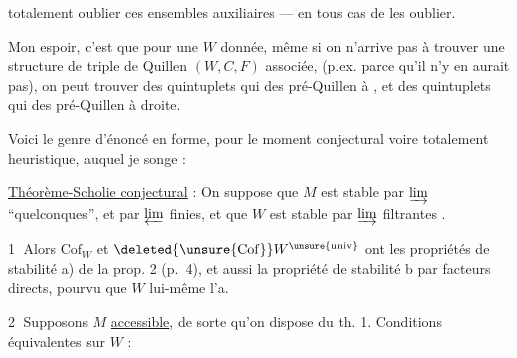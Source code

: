 
totalement oublier ces ensembles auxiliaires
---  en tous cas de les oublier.

Mon espoir, c'est que pour une $W$ donnée,
même si on n'arrive pas à trouver
une structure de triple de Quillen
$(W,C,F)$ associée, (p.ex. parce qu'il n'y en
aurait pas), on peut trouver  des
quintuplets  qui  des pré-Quillen à ,
et des quintuplets  qui  des pré-Quillen
à droite.

Voici le genre d'énoncé en forme,
pour le moment conjectural voire totalement
heuristique, auquel je songe :

\uline{Théorème-Scholie conjectural} : On suppose
que $M$ est stable par $\varinjlim$ ``quelconques'',
et par $\varprojlim$ finies, et que $W$ est
stable par $\varinjlim$ filtrantes  .

\textcircled{1} Alors $\mathrm{Cof}_{W}$ et $\deleted{\unsure{\mathrm{Cof}}}W^{\unsure{\mathrm{univ}}}$ ont les
propriétés de stabilité a)  de la
prop. 2 (p.~4), et aussi la propriété de
stabilité b par facteurs directs, pourvu
que $W$ lui-même l'a.

\textcircled{2} Supposons $M$ \uline{accessible}, de sorte qu'on
dispose du th. 1.  Conditions
équivalentes sur $W$ :
